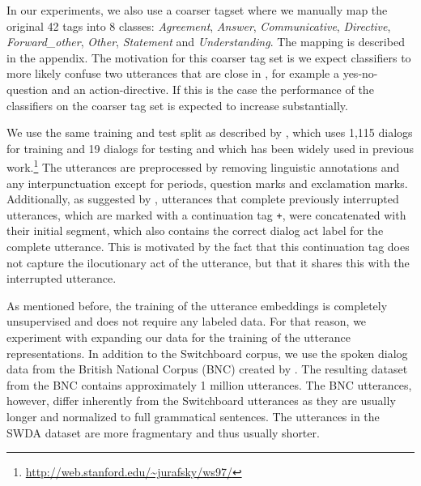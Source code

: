 In our experiments, we also use a coarser tagset where we manually map the original 42 tags into 8 classes: \emph{Agreement}, \emph{Answer}, \emph{Communicative}, \emph{Directive}, \emph{Forward\_other}, \emph{Other},  \emph{Statement} and \emph{Understanding}.
The mapping is described in the appendix.
The motivation for this coarser tag set is we expect classifiers to more likely confuse two utterances that are close in , for example a yes-no-question and an action-directive.
If this is the case the performance of the classifiers on the coarser tag set is expected to increase substantially.

We use the same training and test split as described by , which uses 1,115 dialogs for training and 19 dialogs for testing and which has been widely used in previous work.\footnote{\url{http://web.stanford.edu/~jurafsky/ws97/}}
The utterances are preprocessed by removing linguistic annotations and any interpunctuation except for periods, question marks and exclamation marks.
Additionally, as suggested by , utterances that complete previously interrupted utterances, which are marked with a continuation tag \texttt{+}, were concatenated with their initial segment, which also contains the correct dialog act label for the complete utterance. This is motivated by the fact that this continuation tag does not capture the ilocutionary act of the utterance, but that it shares this with the interrupted utterance.

As mentioned before, the training of the utterance embeddings is completely unsupervised and does not require any labeled data.
For that reason, we experiment with expanding our data for the training of the utterance representations.
In addition to the Switchboard corpus, we use the spoken dialog data from the British National Corpus (BNC) created by .
The resulting dataset from the BNC contains approximately 1 million utterances. 
The BNC utterances, however, differ inherently from the Switchboard utterances as they are usually longer and normalized to full grammatical sentences.
The utterances in the SWDA dataset are more fragmentary and thus usually shorter.



